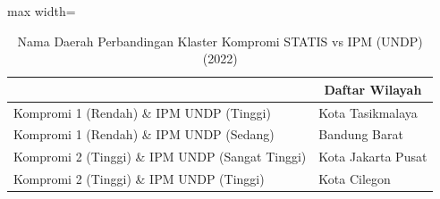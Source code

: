 \begin{table}[H]
\centering
\caption{Nama Daerah Perbandingan Klaster Kompromi STATIS vs IPM (UNDP) (2022)} \label{tab:sample2comp_ipm_name_2022}
\begin{adjustbox}{max width=\textwidth}
\begin{tabular}{|>{\centering\arraybackslash}p{4cm}|p{10cm}|}
\hline
\multicolumn{1}{|c|}{\textbf{Kategori}} & \multicolumn{1}{c|}{\textbf{Daftar Wilayah}} \\
\hline
Kompromi 1 (Rendah) \& IPM UNDP (Tinggi) & Kota Tasikmalaya \\
\hline
Kompromi 1 (Rendah) \& IPM UNDP (Sedang) & Bandung Barat \\
\hline
Kompromi 2 (Tinggi) \& IPM UNDP (Sangat Tinggi) & Kota Jakarta Pusat \\
\hline
Kompromi 2 (Tinggi) \& IPM UNDP (Tinggi) & Kota Cilegon \\
\hline
\end{tabular}
\end{adjustbox}
\end{table}